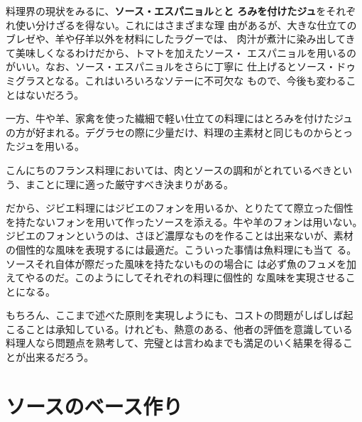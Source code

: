 料理界の現状をみるに、\textbf{ソース・エスパニョル}と\textbf{と
ろみを付けたジュ}をそれぞれ使い分けざるを得ない。これにはさまざまな理
由があるが、大きな仕立てのブレゼや、羊や仔羊以外を材料にしたラグーでは、
肉汁が煮汁に染み出してきて美味しくなるわけだから、トマトを加えたソース・
エスパニョルを用いるのがいい。なお、ソース・エスパニョルをさらに丁寧に
仕上げるとソース・ドゥミグラスとなる。これはいろいろなソテーに不可欠な
もので、今後も変わることはないだろう。

一方、牛や羊、家禽を使った繊細で軽い仕立ての料理にはとろみを付けたジュ
の方が好まれる。デグラセの際に少量だけ、料理の主素材と同じものからとっ
たジュを用いる。

こんにちのフランス料理においては、肉とソースの調和がとれているべきとい
う、まことに理に適った厳守すべき決まりがある。

だから、ジビエ料理にはジビエのフォンを用いるか、とりたてて際立った個性
を持たないフォンを用いて作ったソースを添える。牛や羊のフォンは用いない。
ジビエのフォンというのは、さほど濃厚なものを作ることは出来ないが、素材
の個性的な風味を表現するには最適だ。こういった事情は魚料理にも当て
る。ソースそれ自体が際だった風味を持たないものの場合に
は必ず魚のフュメを加えてやるのだ。このようにしてそれぞれの料理に個性的
な風味を実現させることになる。

もちろん、ここまで述べた原則を実現しようにも、コストの問題がしばしば起
こることは承知している。けれども、熱意のある、他者の評価を意識している
料理人なら問題点を熟考して、完璧とは言わぬまでも満足のいく結果を得るこ
とが出来るだろう。\newpage

\normalsize
{}

\hypertarget{traitement-des-elements-de-base}{%
\section{ソースのベース作り}\label{traitement-des-elements-de-base}}


